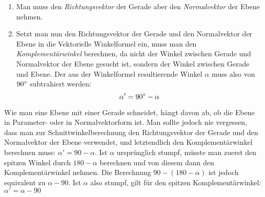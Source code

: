 \begin{enumerate}
  \item Man muss den \emph{Richtungsvektor} der Gerade aber den \emph{Normalvektor} der Ebene nehmen.

  \item Setzt man nun den Richtungsvektor der Gerade und den Normalvektor der Ebene in die Vektorielle Winkelformel ein, muss man den \emph{Komplement\"{a}rwinkel} berechnen, da nicht der Winkel zwischen Gerade und Normalvektor der Ebene gesucht ist, sondern der Winkel zwischen Gerade und Ebene. Der aus der Winkelformel resultierende Winkel $\alpha$ muss also von $90\degree$ subtrahiert werden: $$\alpha' = 90\degree - \alpha$$
\end{enumerate}

\pagebreak


Wie man eine Ebene mit einer Gerade schneidet, h\"{a}ngt davon ab, ob die Ebene in Parameter- oder in Normalvektorform ist. Man sollte jedoch nie vergessen, dass man zur Schnittwinkelberechnung den Richtungsvektor der Gerade und den Normalvektor der Ebene verwendet, und letztendlich den Komplement\"{a}rwinkel berechnen muss: $\alpha' = 90 - \alpha$. Ist $\alpha$ urspr\"{u}nglich stumpf, m\"{u}sste man zuerst den spitzen Winkel durch $180 - \alpha$ berechnen und von diesem dann den Komplement\"{a}rwinkel nehmen. Die Berechnung $90 - (180 - \alpha)$ ist jedoch equivalent zu $\alpha - 90$. Ist $\alpha$ also stumpf, gilt f\"{u}r den spitzen Komplement\"{a}rwinkel: $\alpha' = \alpha - 90$

